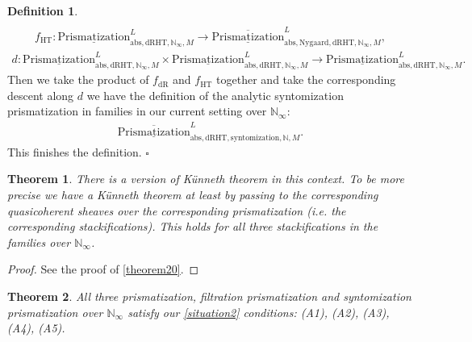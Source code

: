 \documentclass[12pt]{article}
\newtheorem{theorem}{Theorem}
\theoremstyle{definition}
\newtheorem{definition}{Definition}
\begin{document}
\begin{definition}
\begin{align}
\end{align}
\begin{align}
f_\mathrm{HT}: {\underline{\mathrm{Prismatization}}}^L_{\mathrm{abs},\mathrm{dRHT},\mathbb{N}_\infty,M}\rightarrow \overline{\underline{\mathrm{Prismatization}}}^L_{\mathrm{abs},\mathrm{Nygaard},\mathrm{dRHT},\mathbb{N}_\infty,M},
\end{align}
\begin{align}
d:  {\underline{\mathrm{Prismatization}}}^L_{\mathrm{abs},\mathrm{dRHT},\mathbb{N}_\infty,M}\times {\underline{\mathrm{Prismatization}}}^L_{\mathrm{abs},\mathrm{dRHT},\mathbb{N}_\infty,M} \rightarrow {\underline{\mathrm{Prismatization}}}^L_{\mathrm{abs},\mathrm{dRHT},\mathbb{N}_\infty,M}.
\end{align}
Then we take the product of $f_\mathrm{dR}$ and $f_\mathrm{HT}$ together and take the corresponding descent along $d$ we have the definition of the analytic syntomization prismatization in families in our current setting over $\mathbb{N}_\infty$:
\begin{align}
\overline{\underline{\mathrm{Prismatization}}}^L_{\mathrm{abs},\mathrm{dRHT},\mathrm{syntomization},\mathbb{N},M}. 
\end{align}
This finishes the definition. $\square$
\end{definition}

\begin{theorem}
There is a version of K\"unneth theorem in this context. To be more precise we have a K\"unneth theorem at least by passing to the corresponding quasicoherent sheaves over the corresponding prismatization (i.e. the corresponding stackifications). This holds for all three stackifications in the families over $\mathbb{N}_\infty$. 
\end{theorem}

\begin{proof}
See the proof of \cref{theorem20}.
\end{proof}

\begin{theorem}
All three prismatization, filtration prismatization and syntomization prismatization over $\mathbb{N}_\infty$ satisfy our \cref{situation2} conditions: (A1), (A2), (A3), (A4), (A5).
\end{theorem}
\end{document}
